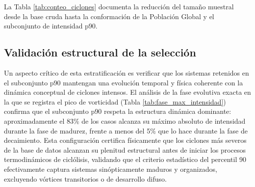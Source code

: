 La Tabla \ref{tab:conteo_ciclones} documenta la reducción del tamaño muestral desde la base cruda hasta la conformación de la Población Global y el subconjunto de intensidad p90.




% 
\subsection{Validación estructural de la selección}\label{subsec:validacao_selecao}

Un aspecto crítico de esta estratificación es verificar que los sistemas retenidos en el subconjunto p90 mantengan una evolución temporal y física coherente con la dinámica conceptual de ciclones intensos. El análisis de la fase evolutiva exacta en la que se registra el pico de vorticidad (Tabla \ref{tab:fase_max_intensidad}) confirma que el subconjunto p90 respeta la estructura dinámica dominante: aproximadamente el 83\% de los casos alcanza su máximo absoluto de intensidad durante la fase de madurez, frente a menos del 5\% que lo hace durante la fase de decaimiento. Esta configuración certifica físicamente que los ciclones más severos de la base de datos alcanzan su plenitud estructural antes de iniciar los procesos termodinámicos de ciclólisis, validando que el criterio estadístico del percentil 90 efectivamente captura sistemas sinópticamente maduros y organizados, excluyendo vórtices transitorios o de desarrollo difuso.

